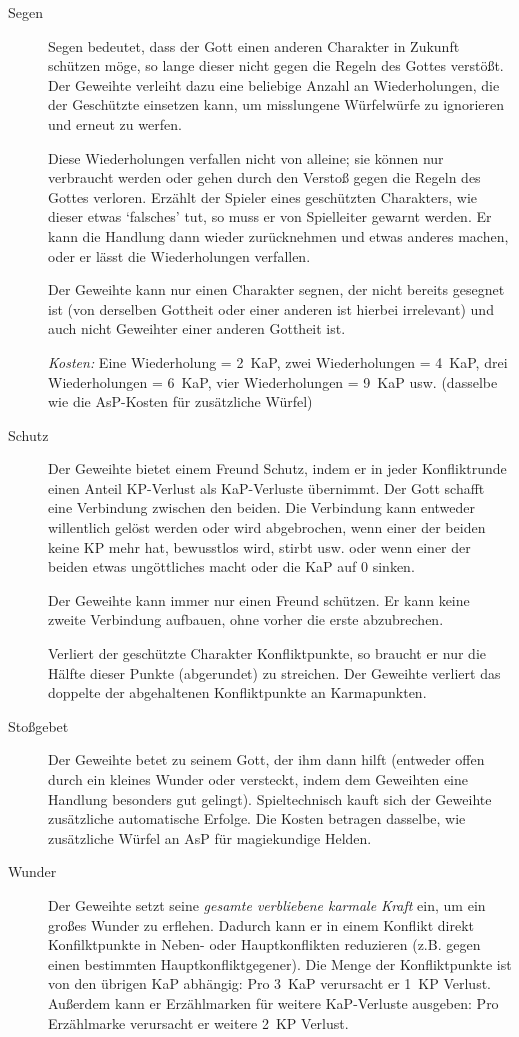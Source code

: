 \begin{description}
\item[Segen]
Segen bedeutet, dass der Gott einen anderen Charakter in Zukunft schützen möge, so lange dieser nicht gegen die Regeln des Gottes verstößt. Der Geweihte verleiht dazu eine beliebige Anzahl an Wiederholungen, die der Geschützte einsetzen kann, um misslungene Würfelwürfe zu ignorieren und erneut zu werfen.

Diese Wiederholungen verfallen nicht von alleine; sie können nur verbraucht werden oder gehen durch den Verstoß gegen die Regeln des Gottes verloren. Erzählt der Spieler eines geschützten Charakters, wie dieser etwas `falsches' tut, so muss er von Spielleiter gewarnt werden. Er kann die Handlung dann wieder zurücknehmen und etwas anderes machen, oder er lässt die Wiederholungen verfallen.

Der Geweihte kann nur einen Charakter segnen, der nicht bereits gesegnet ist (von derselben Gottheit oder einer anderen ist hierbei irrelevant) und auch nicht Geweihter einer anderen Gottheit ist.

\emph{Kosten:} Eine Wiederholung = 2~KaP, zwei Wiederholungen = 4~KaP, drei Wiederholungen = 6~KaP, vier Wiederholungen = 9~KaP usw. (dasselbe wie die AsP-Kosten für zusätzliche Würfel)

\item[Schutz]
Der Geweihte bietet einem Freund Schutz, indem er in jeder Konfliktrunde einen Anteil KP-Verlust als KaP-Verluste übernimmt. Der Gott schafft eine Verbindung zwischen den beiden. Die Verbindung kann entweder willentlich gelöst werden oder wird abgebrochen, wenn einer der beiden keine KP mehr hat, bewusstlos wird, stirbt usw. oder wenn einer der beiden etwas ungöttliches macht oder die KaP auf 0 sinken.

Der Geweihte kann immer nur einen Freund schützen. Er kann keine zweite Verbindung aufbauen, ohne vorher die erste abzubrechen.

Verliert der geschützte Charakter Konfliktpunkte, so braucht er nur die Hälfte dieser Punkte (abgerundet) zu streichen. Der Geweihte verliert das doppelte der abgehaltenen Konfliktpunkte an Karmapunkten.

\item[Stoßgebet]
Der Geweihte betet zu seinem Gott, der ihm dann hilft (entweder offen durch ein kleines Wunder oder versteckt, indem dem Geweihten eine Handlung besonders gut gelingt). Spieltechnisch kauft sich der Geweihte zusätzliche automatische Erfolge. Die Kosten betragen dasselbe, wie zusätzliche Würfel an AsP für magiekundige Helden.

\item[Wunder]
Der Geweihte setzt seine \emph{gesamte verbliebene karmale Kraft} ein, um ein großes Wunder zu erflehen. Dadurch kann er in einem Konflikt direkt Konfilktpunkte in Neben- oder Hauptkonflikten reduzieren (z.B. gegen einen bestimmten Hauptkonfliktgegener). Die Menge der Konfliktpunkte ist von den übrigen KaP abhängig: Pro 3~KaP verursacht er 1~KP Verlust. Außerdem kann er Erzählmarken für weitere KaP-Verluste ausgeben: Pro Erzählmarke verursacht er weitere 2~KP Verlust.
\end{description}



